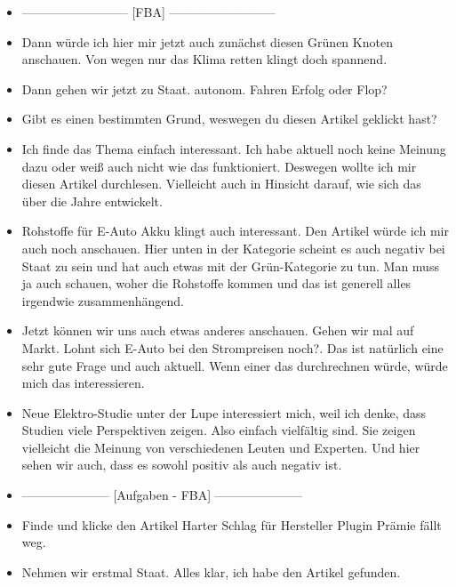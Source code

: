 {\begin{itemize}[]
        \item {--------------------------} [FBA] {--------------------------}
        \item {} Dann würde ich hier mir jetzt auch zunächst diesen Grünen Knoten anschauen.
              \flqq Von wegen nur das Klima retten\frqq{} klingt doch spannend.
        \item {} Dann gehen wir jetzt zu Staat. \flqq autonom. Fahren Erfolg oder Flop?\frqq{}
        \item {} Gibt es einen bestimmten Grund, weswegen du diesen Artikel geklickt hast?
        \item {} Ich finde das Thema einfach interessant.
              Ich habe aktuell noch keine Meinung dazu oder weiß auch nicht wie das funktioniert.
              Deswegen wollte ich mir diesen Artikel durchlesen.
              Vielleicht auch in Hinsicht darauf, wie sich das über die Jahre entwickelt.
        \item {} \flqq Rohstoffe für E-Auto Akku\frqq{} klingt auch interessant.
              Den Artikel würde ich mir auch noch anschauen.
              Hier unten in der Kategorie scheint es auch negativ bei Staat zu sein und hat auch etwas mit der Grün-Kategorie zu tun.
              Man muss ja auch schauen, woher die Rohstoffe kommen und das ist generell alles irgendwie zusammenhängend.
        \item {} Jetzt können wir uns auch etwas anderes anschauen.
              Gehen wir mal auf Markt.
              \flqq Lohnt sich E-Auto bei den Strompreisen noch?\frqq{}.
              Das ist natürlich eine sehr gute Frage und auch aktuell.
              Wenn einer das durchrechnen würde, würde mich das interessieren.
        \item {} \flqq Neue Elektro-Studie unter der Lupe\frqq{} interessiert mich, weil ich denke, dass Studien viele Perspektiven zeigen.
              Also einfach vielfältig sind.
              Sie zeigen vielleicht die Meinung von verschiedenen Leuten und Experten.
              Und hier sehen wir auch, dass es sowohl positiv als auch negativ ist.
        \item {---------------------} [Aufgaben - FBA] {---------------------}
        \item {} Finde und klicke den Artikel \flqq Harter Schlag für Hersteller Plugin Prämie fällt weg\frqq{}.
        \item {} Nehmen wir erstmal Staat. Alles klar, ich habe den Artikel gefunden.

\end{itemize}}
